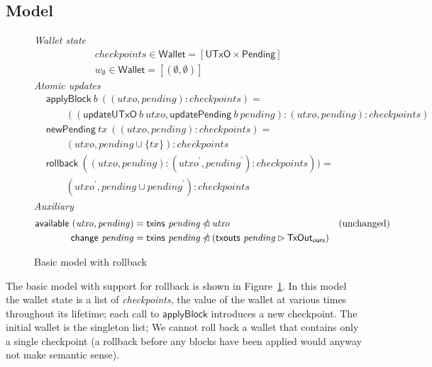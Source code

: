 \documentclass{article}
\newcommand{\restrictdom}{\lhd}
\newcommand{\subtractdom}{\mathbin{\slashed{\restrictdom}}}
\newcommand{\restrictrange}{\rhd}
\numberwithin{equation}{lemma}
\begin{document}
\subsection{Model}

\begin{figure}
%
\emph{Wallet state}
%
\begin{align*}
& \mathit{checkpoints} \in \mathsf{Wallet} = [\mathsf{UTxO} \times \mathsf{Pending}] \\
& w_\emptyset \in \mathsf{Wallet} = [(\emptyset, \emptyset)]
\end{align*}
%
\emph{Atomic updates}
%
\begin{align*}
& \mathsf{applyBlock} ~ b ~ ((\mathit{utxo}, \mathit{pending}) : \mathit{checkpoints}) = \\
& \qquad (( \mathsf{updateUTxO} ~ b ~ \mathit{utxo}
         , \mathsf{updatePending} ~ b ~ \mathit{pending}
         )
         : (\mathit{utxo}, \mathit{pending}) : \mathit{checkpoints}
         ) \\
& \mathsf{newPending} ~ tx ~ ((\mathit{utxo}, \mathit{pending}) : \mathit{checkpoints}) = \\
& \qquad (\mathit{utxo}, pending \cup \{ tx \} ) : \mathit{checkpoints} \\
& \mathsf{rollback} ~ ((\mathit{utxo}, \mathit{pending}) :  (\mathit{utxo}^\prime, \mathit{pending}^\prime) : \mathit{checkpoints})) = \\
& \qquad (\mathit{utxo}^\prime, \mathit{pending} \cup \mathit{pending}^\prime) : \mathit{checkpoints}
\end{align*}
%
\emph{Auxiliary}
%
\begin{align*}
\mathsf{available} ~ (\mathit{utxo}, \mathit{pending})
   & = \mathsf{txins} ~ \mathit{pending} \subtractdom \mathit{utxo} & \text{(unchanged)} \\
\mathsf{change} ~ \mathit{pending}
   & = \mathsf{txins} ~ \mathit{pending} \subtractdom (\mathsf{txouts} ~ \mathit{pending} \restrictrange \mathsf{TxOut_{ours}})
\end{align*}
%
\caption{\label{fig:basic_rollback_model}Basic model with rollback}
\end{figure}

The basic model with support for rollback is shown in
Figure~\ref{fig:basic_rollback_model}. In this model the wallet state is a list
of \emph{checkpoints}, the value of the wallet at various times throughout its
lifetime; each call to $\mathsf{applyBlock}$ introduces a new checkpoint. The
initial wallet is the singleton list; We cannot roll back a wallet that contains
only a single checkpoint (a rollback before any blocks have been applied would
anyway not make semantic sense).
\end{document}
